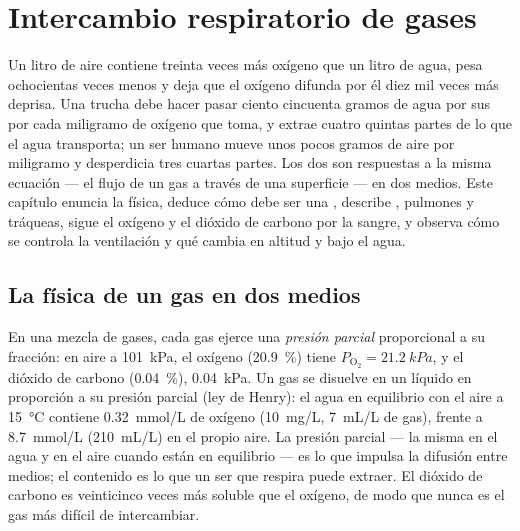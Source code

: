 \chapter{Intercambio respiratorio de gases}\label{ch:b1:gas-exchange}

Un litro de aire contiene treinta veces más oxígeno que un litro de agua,
pesa ochocientas veces menos y deja que el oxígeno difunda por él diez mil
veces más deprisa. Una trucha debe hacer pasar ciento cincuenta gramos de
agua por sus  por cada miligramo de oxígeno que toma, y extrae
cuatro quintas partes de lo que el agua transporta; un ser humano mueve unos
pocos gramos de aire por miligramo y desperdicia tres cuartas partes. Los
dos  son respuestas a la misma ecuación --- el flujo de un gas a
través de una superficie --- en dos medios. Este capítulo enuncia la física,
deduce cómo debe ser una , describe ,
pulmones y tráqueas, sigue el oxígeno y el dióxido de carbono por la sangre,
y observa cómo se controla la ventilación y qué cambia en altitud y bajo el
agua.

\section{La física de un gas en dos medios}

\begin{definition}\label{def:b1:gas-exchange:partial}
En una mezcla de gases, cada gas ejerce una \emph{presión parcial}
proporcional a su fracción: en aire a \qty{101}{kPa}, el oxígeno
(\qty{20.9}{\%}) tiene $P_{\mathrm{O_2}} = \qty{21.2}{kPa}$, y el dióxido de
carbono (\qty{0.04}{\%}), \qty{0.04}{kPa}. Un gas se disuelve en un líquido
en proporción a su presión parcial (ley de Henry): el agua en equilibrio con
el aire a \qty{15}{\celsius} contiene \qty{0.32}{mmol/L} de oxígeno
(\qty{10}{mg/L}, \qty{7}{mL/L} de gas), frente a \qty{8.7}{mmol/L}
(\qty{210}{mL/L}) en el propio aire. La presión parcial --- la misma en el
agua y en el aire cuando están en equilibrio --- es lo que impulsa la
difusión entre medios; el contenido es lo que un ser que respira puede
extraer. El dióxido de carbono es veinticinco veces más soluble que el
oxígeno, de modo que nunca es el gas más difícil de intercambiar.
\end{definition}

